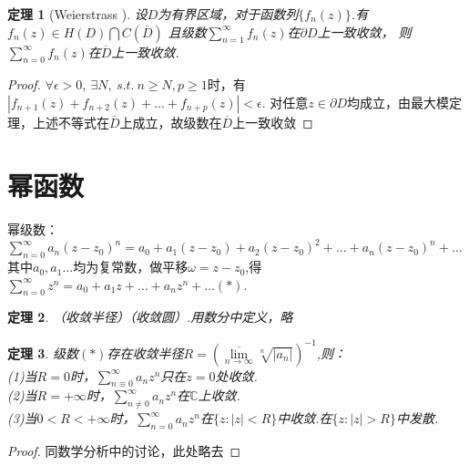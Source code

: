 \documentclass[b5paper,decoration]{qyxf-book}%
\newtheorem{mypro}{定理}[section]%
\begin{document}
\begin{mypro}[Weierstrass \uppercase\expandafter{}]
    设$D$为有界区域，对于函数列$\{f_n(z)\}$.有$f_n(z)\in H(D)\bigcap C(\overline{D})$
    且级数$\displaystyle{\sum\limits_{n=1}^\infty f_n(z)}$在$\partial D$上一致收敛，
    则$\displaystyle{\sum\limits_{n=0}^\infty f_n(z)}$在$\overline{D}$上一致收敛.
\end{mypro}
\begin{proof}
    $\forall\epsilon>0,\ \exists N,\ s.t.\ n\geq N, p\geq1$时，有$\left|f_{n+1}(z)+f_{n+2}(z)+\dots+f_{n+p}(z)\right|<\epsilon.$
    对任意$z\in\partial D$均成立，由最大模定理，上述不等式在$\overline{D}$上成立，故级数在$\overline{D}$上一致收敛
\end{proof}

\section{幂函数}
幂级数：$\displaystyle{\sum\limits_{n=0}^\infty} a_n(z-z_0)^n=a_0+a_1(z-z_0)+a_2(z-z_0)^2+\dots+a_n(z-z_0)^n+\dots$\\
其中$a_0,a_1\dots$均为复常数，做平移$\omega=z-z_0$,得$\displaystyle{\sum\limits_{n=0}^\infty z^n=a_0+a_1z+\dots+a_nz^n+\dots(*)}$.
\begin{mypro}
    （收敛半径）（收敛圆）.用数分中定义，略
\end{mypro}

\begin{mypro}
    级数$(*)$存在收敛半径$R=(\overline{\lim\limits_{n\to\infty}}\sqrt[n]{|a_n|})^{-1}$,则：\\
    (1)当$R=0$时，$\displaystyle{\sum\limits_{n\equiv0}^\infty a_nz^n}$只在$z=0$处收敛.\\
    (2)当$R=+\infty$时，$\displaystyle{\sum\limits_{n\neq0}^\infty a_nz^n}$在$\mathbb{C}$上收敛.\\
    (3)当$0<R<+\infty$时，$\displaystyle{\sum\limits_{n=0}^\infty a_nz^n}$在$\{z:|z|<R\}$中收敛.在$\{z:|z|>R\}$中发散.
\end{mypro}
\begin{proof}
    同数学分析中的讨论，此处略去
\end{proof}
\end{document}
